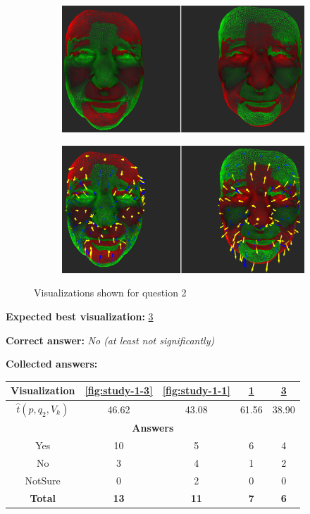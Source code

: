 \begin{figure}[h]
\begin{subfigure}{0.49\textwidth}
\includegraphics[width=\textwidth]{./screenshots/pair2.PNG}
\caption{}
\label{fig:study-1-2}
\end{subfigure}
\begin{subfigure}{0.49\textwidth}
\includegraphics[width=\textwidth]{./screenshots/pair4.PNG}
\caption{}
\label{fig:study-1-4}
\end{subfigure}
\caption{Visualizations shown for question 2}
\end{figure}
\medskip

{\bf Expected best visualization:} \ref{fig:study-1-4}
\medskip

{\bf Correct answer:} {\it No (at least not significantly)}
\medskip

{\bf Collected answers:}

\begin{center}
\begin{tabular}{| c | c | c | c | c |}
	\hline
	Visualization & \ref{fig:study-1-3} & \ref{fig:study-1-1} & \ref{fig:study-1-2} & \ref{fig:study-1-4}\\ \hline
	\(\widehat{t}(p, q_2, V_k)\) & 46.62 & 43.08 & 61.56 & 38.90\\ \hline
	\multicolumn{5}{|c|}{\bf Answers} \\ \hline
	Yes & 10 & 5 & 6 & 4\\ \hline
	\rowcolor{yellow!30} No & 3 & 4 & 1 & 2\\ \hline
	NotSure & 0 & 2 & 0 & 0\\ \hline
	{\bf Total} & {\bf 13} & {\bf 11} & {\bf 7} & {\bf 6}\\ \hline
\end{tabular}
\end{center}
\clearpage

